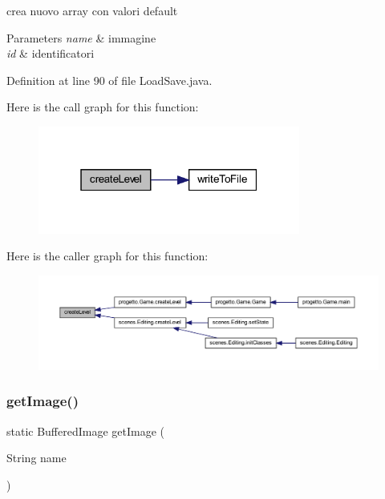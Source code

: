 crea nuovo array con valori default 


\begin{DoxyParams}{Parameters}
{\em name} & immagine \\
\hline
{\em id} & identificatori \\
\hline
\end{DoxyParams}


Definition at line 90 of file Load\+Save.\+java.

Here is the call graph for this function\+:\nopagebreak
\begin{figure}[H]
\begin{center}
\leavevmode
\includegraphics[width=244pt]{classhelpz_1_1_load_save_a934717f63182b47ab05a70ec40cef235_cgraph}
\end{center}
\end{figure}
Here is the caller graph for this function\+:\nopagebreak
\begin{figure}[H]
\begin{center}
\leavevmode
\includegraphics[width=350pt]{classhelpz_1_1_load_save_a934717f63182b47ab05a70ec40cef235_icgraph}
\end{center}
\end{figure}
\mbox{\label{classhelpz_1_1_load_save_adfcdec0c763af178ffbfea94f4ccd263}} 
\subsubsection{\texorpdfstring{get\+Image()}{getImage()}}
{\footnotesize\ttfamily static Buffered\+Image get\+Image (\begin{DoxyParamCaption}\item[{String}]{name }\end{DoxyParamCaption})\hspace{0.3cm}{\ttfamily [static]}}



